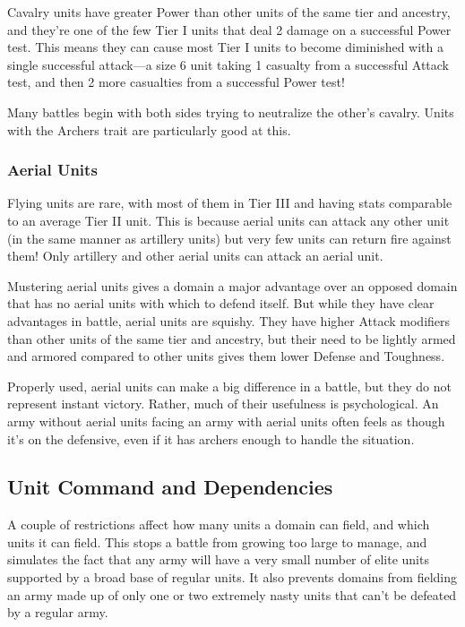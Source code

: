 \documentclass[10pt,a4paper,twoside,bg=print,twocolumn,openany,nodeprecatedcode]{dndbook}
\begin{document}
Cavalry units have greater Power than other units of the same tier and ancestry, and they're one of the few Tier I units that deal 2 damage on a successful Power test. This means they can cause most Tier I units to become diminished with a single successful attack—a size 6 unit taking 1 casualty from a successful Attack test, and then 2 more casualties from a successful Power test!

Many battles begin with both sides trying to neutralize the other's cavalry. Units with the Archers trait are particularly good at this.

\subsubsection{Aerial Units}
Flying units are rare, with most of them in Tier III and having stats comparable to an average Tier II unit. This is because aerial units can attack any other unit (in the same manner as artillery units) but very few units can return fire against them! Only artillery and other aerial units can attack an aerial unit.

Mustering aerial units gives a domain a major advantage over an opposed domain that has no aerial units with which to defend itself. But while they have clear advantages in battle, aerial units are squishy. They have higher Attack modifiers than other units of the same tier and ancestry, but their need to be lightly armed and armored compared to other units gives them lower Defense and Toughness.

Properly used, aerial units can make a big difference in a battle, but they do not represent  instant victory. Rather, much of their usefulness is psychological. An army without aerial units facing an army with aerial units often feels as though it's on the defensive, even if it has archers enough to handle the situation.

\subsection{Unit Command and Dependencies}
A couple of restrictions affect how many units a domain can field, and which units it can field. This stops a battle from growing too large to manage, and simulates the fact that any army will have a very small number of elite units supported by a broad base of regular units. It also prevents domains from fielding an army made up of only one or two extremely nasty units that can't be defeated by a regular army.
\end{document}
